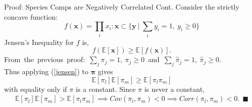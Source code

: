 \documentclass[ xcolor = pdftex, dvipsnames, table ]{beamer}
\begin{document}
%
\begin{frame}{Proof: Species Comps are Negatively Correlated Cont.}
	Consider the strictly concave function:
	\begin{equation*}
		 f(\bm{x})=\textstyle{\prod_i} x_i : \bm{x}\subset\Big\{\bm{y}~|~\textstyle{\sum_i} y_i = 1,~y_i \ge 0\Big\} 
	\end{equation*}  	
	Jensen's Inequality for $f$ is,
	\begin{equation}
		f(\mathbb{E}[\bm{x}]) \ge \mathbb{E}[f(\bm{x})].
		\label{jensen}
	\end{equation}
	\mbox{From the previous proof: $\sum_j \pi_{j} = 1,~\pi_j \ge 0$ and $\sum_j \hat\pi_{j} = 1,~\hat\pi_j \ge 0$.}\\
        Thus applying (\ref{jensen}) to $\bm{\pi}$ gives  
	\begin{equation}
		\mathbb{E}[\pi_{l}]\mathbb{E}[\pi_{m}] \ge \mathbb{E}[\pi_{l}\pi_{m}]
	\end{equation}
	with equality only if $\pi$ is a constant. Since $\pi$ is never a constant, 
	\begin{align*}
		\mathbb{E}[\pi_{l}]\mathbb{E}[\pi_{m}] > \mathbb{E}[\pi_{l}\pi_{m}] \implies Cov(\pi_{l}, \pi_{m})<0 \implies Corr(\pi_{l}, \pi_{m})<0. ~~\blacksquare
	\end{align*} 
\end{frame}

%
\end{document}
